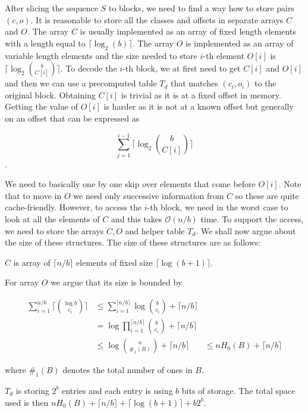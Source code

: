 After slicing the sequence $S$ to blocks, we need to find a way how to store
pairs $(c, o)$. It is reasonable to store all the classes and offsets in separate
arrays $C$ and $O$. The array $C$ is usually implemented as an array of fixed length
elements with a length equal to $\lceil \log_2(b)\rceil$. The array $O$ is implemented as an
array of variable length elements and the size needed to store $i$-th element $O[i]$ is
$\lceil \log_2{b\choose C[i]}\rceil$. To decode the $i$-th block, we at first need to get
$C[i]$ and $O[i]$ and then we can use a precomputed table $T_d$ that matches $(c_i, o_i)$
to the original block. Obtaining $C[i]$ is trivial as it is at a fixed offset in
memory. Getting the value of $O[i]$ is harder as it is not at a known offset but generally
on an offset that can be expressed as

                $$\sum_{j=1}^{i-1} \lceil\log_2{b\choose C[i]}\rceil$$.

We need to basically one by one skip over elements that come before $O[i]$.
Note that to move in $O$ we need only successive information from $C$ so these
are quite cache-friendly. However, to access the $i$-th block, we need in the worst
case to look at all the elements of $C$ and this takes $\mathcal{O}(n/b)$ time. To support
the access, we need to store the arrays $C, O$ and helper table $T_d$. We shall
now argue about the size of these structures. The size of these structures are
as follows:

$C$ is array of $\lceil n/b \rceil$ elements of fixed size $\lceil \log(b+1) \rceil$.

For array $O$ we argue that its size is bounded by

\begin{align*}
    \sum_{i=1}^{n/b} \bigg\lceil{\log b\choose c_i}\bigg\rceil
    &\leq \sum_{i=1}^{\lceil n/b \rceil} \log {b\choose c_i} + \lceil n/b \rceil \\
    &= \log\prod_{i=1}^{\lceil n/b \rceil} {b\choose c_i} + \lceil n/b \rceil \\
    &\leq \log{n\choose \#_1(B)} + \lceil n/b \rceil &\leq nH_0(B) + \lceil n/b \rceil
    \end{align*}

where $\#_1(B)$ denotes the total number of ones in $B$. 

$T_d$ is storing $2^b$ entries and each entry is using $b$ bits of storage.
The total space used is then $nH_0(B) +  \lceil n/b \rceil + \lceil \log(b+1) \rceil + b2^b$.

